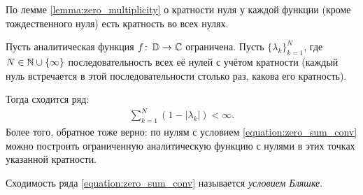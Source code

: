 \documentclass[../complex-analysis.tex]{subfiles}
\begin{document}
По лемме \eqref{lemma:zero_multiplicity} о кратности нуля у каждой функции (кроме тождественного нуля) есть кратность во всех нулях.

\begin{thm}
 Пусть аналитическая функция $ f\colon\,\mathbb D \to \mathbb{C} $  ограничена. Пусть $\{\lambda_{k}\}_{k=1}^{N} $,  где $ N \in \mathbb{N} \cup \left\{ \infty \right\} $ последовательность всех её нулей с учётом кратности (каждый нуль встречается в этой последовательности столько раз, какова его кратность).

 Тогда сходится ряд:
 \begin{align}
  \label{equation:zero_sum_conv}
  \sum_{k=1}^{N} \left( 1 - \left| \lambda_k \right| \right) < \infty.
 \end{align} Более того, обратное тоже верно: по нулям с условием \eqref{equation:zero_sum_conv} можно построить ограниченную аналитическую функцию с нулями в этих точках указанной кратности.
\end{thm}
Сходимость ряда \eqref{equation:zero_sum_conv} называется \textit{условием Бляшке}.
\end{document}
